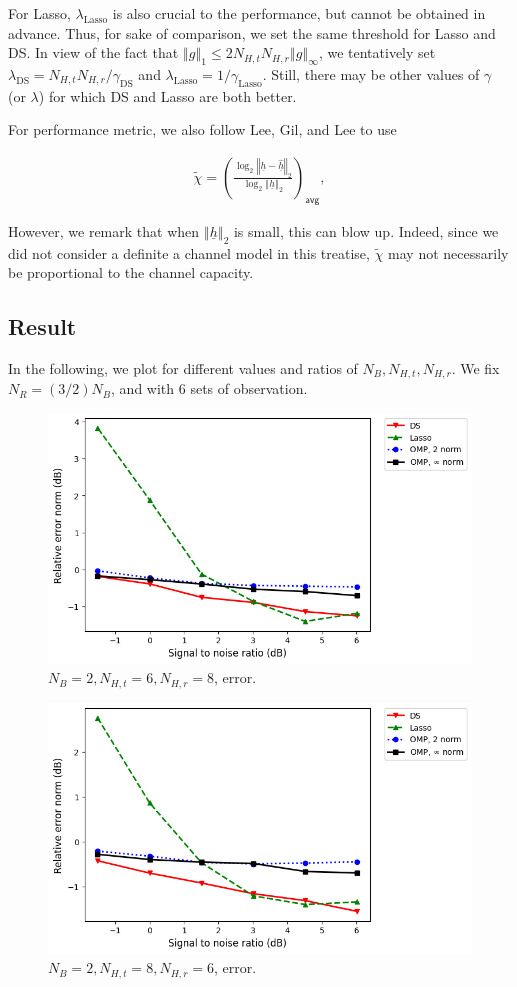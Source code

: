 \documentclass[journal]{IEEEtran}
\newcommand {\g} {\gamma}
\renewcommand {\l} {\lambda}
\newcommand {\m} [1] {\( #1 \)}
\newcommand {\V} [1] {\underline {#1}}
\newcommand {\T} [1] {\tilde {#1}}
\newcommand {\RB} [1] {\left( #1 \right)}
\newcommand {\VNm} [1] {\left \Vert #1 \right \Vert}
\newcommand {\Disp} [1] {
   \begin {align*}
      #1
   \end {align*}
}
\begin{document}
For Lasso, \m {\l _{\mathrm {Lasso}}} is also crucial to the performance, but cannot be obtained in advance.
Thus, for sake of comparison, we set the same threshold for Lasso and DS.
In view of the fact that \m {\VNm {g} _1 \leq 2 N_{H,t} N_{H,r} \VNm {g} _\infty}, we tentatively set \m {\l _{\mathrm {DS}} =  N_{H,t} N_{H,r} / \g _{\mathrm {DS}}} and \m {\l _{\mathrm {Lasso}} =  1 / \g _{\mathrm {Lasso}}}.
Still, there may be other values of \m {\g} (or \m {\l}) for which DS and Lasso are both better.

For performance metric, we also follow Lee, Gil, and Lee \cite {LGL16} to use
\Disp {
\tilde {\chi}
=\RB {
   \frac {\log_2 {\VNm {\V {h} -\hat {\V {h}}} _2}}
   {\log_2 {\VNm {\V {h}}_2}}
} _{\mathsf {avg}}, 
}
However, we remark that when \m {\VNm {\V {h}}_2} is small, this can blow up.
Indeed, since we did not consider a definite a channel model in this treatise, \m {\T {\chi}} may not necessarily be proportional to the channel capacity.

\subsection {Result}

In the following, we plot for different values and ratios of \m {N_B, N_{H,t}, N_{H,r}}.
We fix \m {N_R = \RB {3/2} N_B}, and with \m {6} sets of observation.

\begin {figure} [H]
\includegraphics [width = 0.45 \textwidth]
{error-small-more-tall-six-usual.png}
\caption {\m {N_B = 2, N_{H,t} = 6, N_{H,r} = 8}, error.}
\end {figure}

\begin {figure} [H]
\includegraphics [width = 0.45 \textwidth]
{error-small-more-wide-six-usual.png}
\caption {\m {N_B = 2, N_{H,t} = 8, N_{H,r} = 6}, error.}
\end {figure}
\end{document}
